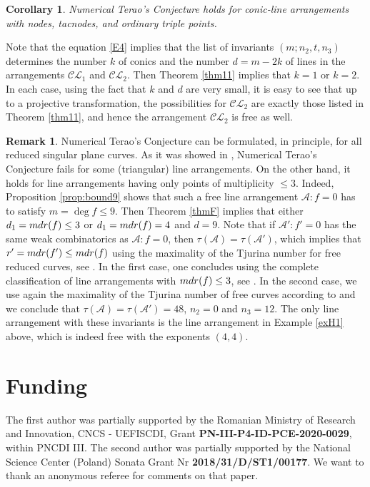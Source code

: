 \documentclass[12pt]{amsart}
\theoremstyle{plain}
\newtheorem{cor}[subsection]{Corollary}
\theoremstyle{definition}
\newtheorem{rk}[subsection]{Remark}
\numberwithin{equation}{section}
\newcommand{\A}{{\mathcal A}}
\begin{document}
\begin{cor}
\label{cor5}
Numerical Terao's Conjecture holds for conic-line arrangements with nodes, tacnodes, and ordinary triple points.
\end{cor}
\proof
Note that the equation \eqref{E4} implies that the list of invariants $(m; n_{2}, t, n_{3})$ determines the number $k$ of conics  and the number $d=m-2k$ of lines in the arrangements  $\mathcal{CL}_{1}$ and  $\mathcal{CL}_{2}$. 
Then Theorem \ref{thm11} implies that $k=1$ or $k=2$.
In each case, using the fact that $k$ and $d$ are very small, it is easy to see that  up to a projective transformation, the possibilities for $\mathcal{CL}_{2}$ are exactly those listed in Theorem \ref{thm11}, and hence the arrangement $\mathcal{CL}_{2}$ is free as well.
\endproof
\begin{rk}
Numerical Terao's Conjecture can be formulated, in principle, for all reduced singular plane curves. As it was showed in \cite{Mar}, Numerical Terao's Conjecture fails for some (triangular) line arrangements. 
On the other hand, it holds for line arrangements having only points of multiplicity $\leq 3$. Indeed, Proposition \ref{prop:bound9} shows that such a free line arrangement $\mathcal{A}: f=0$ has to satisfy $m= \deg f \leq 9$.
Then Theorem \ref{thmF} implies that either $d_1= {\rm mdr}(f) \leq 3$ or
$d_1= {\rm mdr}(f) = 4$ and $d=9$. Note that if $\mathcal{A}':f'=0$ has the same weak combinatorics as $\A:f=0$, then $\tau(\A)=\tau(\A')$, which implies that
$r'= {\rm mdr}(f') \leq {\rm mdr}(f)$ using the maximality of the Tjurina number for free reduced curves, see \cite{duPlessisWall}.
In the first case, one concludes using the complete classification of line arrangements with ${\rm mdr}(f) \leq 3$, see \cite{BT}. In the second case, we use again the maximality of the Tjurina number of free curves according to \cite{duPlessisWall} and we conclude that $\tau(\A)=\tau(\A')=48$, $n_2=0$ and $n_3=12$. The only line arrangement with these invariants is the line arrangement in Example \ref{exH1} above, which is indeed free with the exponents $(4,4)$.
\end{rk}

\section*{Funding} The first author was partially supported by the Romanian Ministry of Research and Innovation, CNCS - UEFISCDI, Grant \textbf{PN-III-P4-ID-PCE-2020-0029}, within PNCDI III. The second author was partially supported by the National Science Center (Poland) Sonata Grant Nr \textbf{2018/31/D/ST1/00177}. We want to thank an anonymous referee for comments on that paper.
\end{document}
